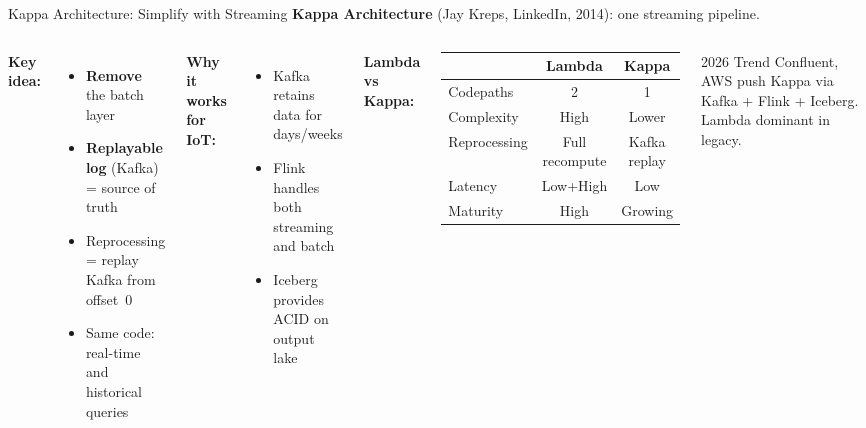 \documentclass[aspectratio=169,11pt]{beamer}
\begin{document}
\begin{frame}{Kappa Architecture: Simplify with Streaming}
    \small
    \textbf{Kappa Architecture} (Jay Kreps, LinkedIn, 2014): one streaming pipeline.

    \vspace{0.05cm}
    \begin{columns}
        \textbf{Key idea:}
        \begin{itemize}\setlength{\itemsep}{0pt}
            \item \textbf{Remove} the batch layer
            \item \textbf{Replayable log} (Kafka) = source of truth
            \item Reprocessing = replay Kafka from offset~0
            \item Same code: real-time and historical queries
        \end{itemize}

        \vspace{0.05cm}
        \textbf{Why it works for IoT:}
        \begin{itemize}\setlength{\itemsep}{0pt}
            \item Kafka retains data for days/weeks
            \item Flink handles both streaming and batch
            \item Iceberg provides ACID on output lake
        \end{itemize}

        \textbf{Lambda vs Kappa:}
        \begin{center}
        \footnotesize
        \begin{tabular}{lcc}
            \toprule
            & \textbf{Lambda} & \textbf{Kappa} \\
            \midrule
            Codepaths & 2 & 1 \\
            Complexity & High & Lower \\
            Reprocessing & Full recompute & Kafka replay \\
            Latency & Low+High & Low \\
            Maturity & High & Growing \\
            \bottomrule
        \end{tabular}
        \normalsize
        \end{center}

        \begin{exampleblock}{2026 Trend}
            Confluent, AWS push Kappa via Kafka + Flink + Iceberg. Lambda dominant in legacy.
        \end{exampleblock}
    \end{columns}
\end{frame}
\end{document}
